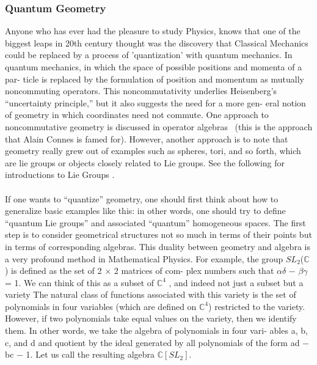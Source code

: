 \documentclass[preprint, 5p, 10pt]{elsarticle}
\theoremstyle{plain}
\begin{document}
\subsubsection{Quantum Geometry}
Anyone who has ever had the pleasure to study Physics,
 knows that one of the biggest leaps in 20th century 
thought was the discovery that Classical Mechanics could be replaced by a process of 
'quantization' with 
quantum mechanics. In quantum mechanics, in which the
space of possible positions and momenta of a par-
ticle is replaced by the formulation of position and
momentum as mutually noncommuting operators. This
noncommutativity underlies Heisenberg’s “uncertainty
principle,” but it also suggests the need for a more gen-
eral notion of geometry in which coordinates need not
commute. One approach to noncommutative geometry
is discussed in operator algebras~\cite{Princeton} (this is the approach that
Alain Connes is famed for). However, another approach is to note that geometry really
grew out of examples such as spheres, tori, and so
forth, which are lie groups or objects closely
related to Lie groups. See the following for introductions to Lie Groups
\cite{GeometryPhysicsTopology,GeometricPhasesinClassicalandQuantum}.
 \paragraph{}\phantom{xxx}If one wants to “quantize” geometry, one should first think about how to generalize
basic examples like this: in other words, one should
try to define “quantum Lie groups” and associated
“quantum” homogeneous spaces.
The first step is to consider geometrical structures
not so much in terms of their points but in terms of
corresponding algebras. This duality between geometry and algebra
is a very profound method in Mathematical Physics. 
For example, the group $SL_{2} $($\mathbb{C}$)
is defined as the set of 2 $\times$ 2 matrices of com-
plex numbers such that $\alpha\delta$ − $\beta\gamma$ = 1. We can think
of this as a subset of $\mathbb{C}^{4}$ , and indeed not just a subset
but a variety  The natural class of functions
associated with this variety is the set of polynomials
in four variables (which are defined on $\mathbb{C}^{4}$) restricted
to the variety. However, if two polynomials take equal
values on the variety, then we identify them. In other
words, we take the algebra of polynomials in four vari-
ables a, b, c, and d and quotient by the
ideal  generated by all polynomials of the
form ad − bc − 1. Let us call the
resulting algebra $\mathbb{C}[SL_{2} ].$
\end{document}
